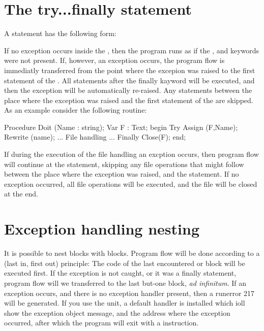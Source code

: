 \documentclass{report}
\begin{document}
\section{The try...finally statement}
A  statement has the following form:

If no exception occurs inside the , then the program
runs as if the ,  and  keywords were not
present.
If, however, an exception occurs, the program flow is immediatly
transferred from the point where the excepion was raised to the first 
statement  of the . 
All statements after the finally kayword will be executed, and then
the exception will be automatically re-raised. Any statements between the
place where the exception was raised and the first statement of the
 are skipped.
As an example consider the following routine:
\begin{listing}
Procedure Doit (Name : string);
Var F : Text;
begin
  Try
    Assign (F,Name);
    Rewrite (name);
    ... File handling ...
  Finally
    Close(F);
  end;  
\end{listing}
If during the execution of the file handling an excption occurs, then
program flow will continue at the  statement, skipping any
file operations that might follow between the place where the exception
was raised, and the  statement.
If no exception occurred, all file operations will be executed, and the file
will be closed at the end.
\section{Exception handling nesting}
It is possible to nest  blocks with 
blocks. Program flow will be done according to a  (last in, first
out) principle: The code of the last encountered  or
  block will be executed first. If the exception is not
caught, or it was a finally statement, program flow will we transferred to
the last but-one block, {\em ad infinitum}.
If an exception occurs, and there is no exception handler present, then a
runerror 217 will be generated. If you use the  unit, a default
handler is installed which ioll show the exception object message, and the
address where the exception occurred, after which the program will exit with
a  instruction.
\end{document}
